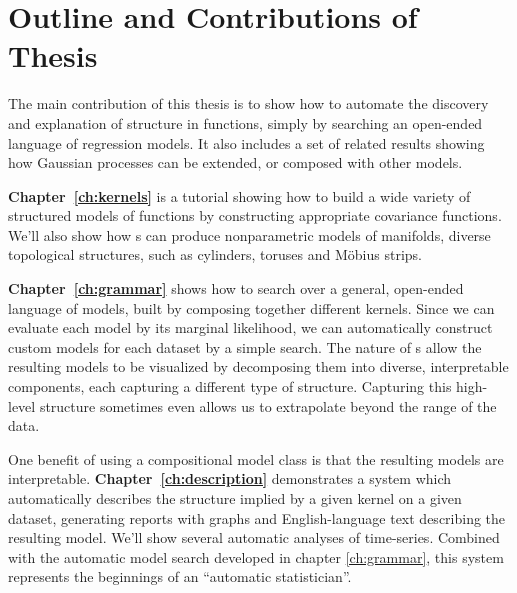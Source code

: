 \section{Outline and Contributions of Thesis}

The main contribution of this thesis is to show how to automate the discovery and explanation of structure in functions, simply by searching an open-ended language of regression models.
It also includes a set of related results showing how Gaussian processes can be extended, or composed with other models.

{\bf Chapter~\ref{ch:kernels}} is a tutorial showing how to build a wide variety of structured models of functions by constructing appropriate covariance functions.
We'll also show how \gp{}s can produce nonparametric models of manifolds, diverse topological structures, such as cylinders, toruses and M\"obius strips.

{\bf Chapter~\ref{ch:grammar}} shows how to search over a general, open-ended language of models, built by composing together different kernels.
Since we can evaluate each model by its marginal likelihood, we can automatically construct custom models for each dataset by a simple search.
The nature of \gp{}s allow the resulting models to be visualized by decomposing them into diverse, interpretable components, each capturing a different type of structure.
Capturing this high-level structure sometimes even allows us to extrapolate beyond the range of the data.

One benefit of using a compositional model class is that the resulting models are interpretable.
{\bf Chapter~\ref{ch:description}} demonstrates a system which automatically describes the structure implied by a given kernel on a given dataset, generating reports with graphs and English-language text describing the resulting model.
We'll show several automatic analyses of time-series.
Combined with the automatic model search developed in chapter \ref{ch:grammar}, this system represents the beginnings of an ``automatic statistician''.

